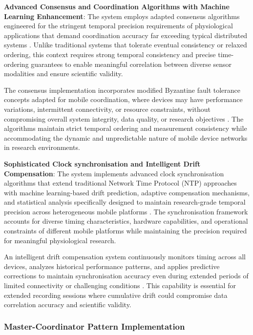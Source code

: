 \documentclass[11pt,a4paper]{report}
\begin{document}
\textbf{Advanced Consensus and Coordination Algorithms with Machine Learning Enhancement}: The system employs adapted consensus algorithms engineered for the stringent temporal precision requirements of physiological applications that demand coordination accuracy far exceeding typical distributed systems \cite{Castro2002}. Unlike traditional systems that tolerate eventual consistency or relaxed ordering, this context requires strong temporal consistency and precise time-ordering guarantees to enable meaningful correlation between diverse sensor modalities and ensure scientific validity.

The consensus implementation incorporates modified Byzantine fault tolerance concepts adapted for mobile coordination, where devices may have performance variations, intermittent connectivity, or resource constraints, without compromising overall system integrity, data quality, or research objectives \cite{Bracha1985}. The algorithms maintain strict temporal ordering and measurement consistency while accommodating the dynamic and unpredictable nature of mobile device networks in research environments.

\textbf{Sophisticated Clock synchronisation and Intelligent Drift Compensation}: The system implements advanced clock synchronisation algorithms that extend traditional Network Time Protocol (NTP) approaches with machine learning-based drift prediction, adaptive compensation mechanisms, and statistical analysis specifically designed to maintain research-grade temporal precision across heterogeneous mobile platforms \cite{Mills2006}. The synchronisation framework accounts for diverse timing characteristics, hardware capabilities, and operational constraints of different mobile platforms while maintaining the precision required for meaningful physiological research.

An intelligent drift compensation system continuously monitors timing across all devices, analyzes historical performance patterns, and applies predictive corrections to maintain synchronisation accuracy even during extended periods of limited connectivity or challenging conditions \cite{Elson2001}. This capability is essential for extended recording sessions where cumulative drift could compromise data correlation accuracy and scientific validity.

\subsubsection{Master-Coordinator Pattern Implementation}
\end{document}
